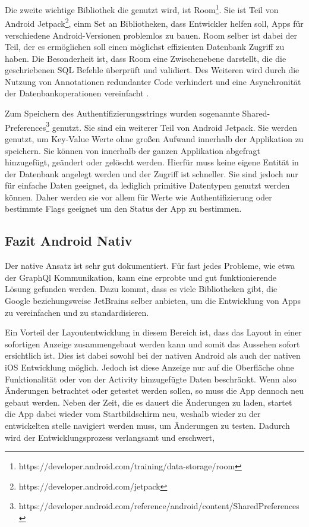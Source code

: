 Die zweite wichtige Bibliothek die genutzt wird, ist Room\footnote{https://developer.android.com/training/data-storage/room}. Sie ist Teil von Android Jetpack\footnote{https://developer.android.com/jetpack}, einm Set an Bibliotheken, dass Entwickler helfen soll, Apps für verschiedene Android-Versionen problemlos zu bauen. Room selber ist dabei der Teil, der es ermöglichen soll einen möglichst effizienten Datenbank Zugriff zu haben.
Die Besonderheit ist, dass Room eine Zwischenebene darstellt, die die geschriebenen SQL Befehle überprüft und validiert. Des Weiteren wird durch die Nutzung von Annotationen redundanter Code verhindert und eine Asynchronität der Datenbankoperationen vereinfacht \cite{Room_docs}.

Zum Speichern des Authentifizierungsstrings wurden sogenannte Shared-Preferences\footnote{https://developer.android.com/reference/android/content/SharedPreferences} genutzt. Sie sind ein weiterer Teil von Android Jetpack. Sie werden genutzt, um Key-Value Werte ohne großen Aufwand innerhalb der Applikation zu speichern. Sie können von innerhalb der ganzen Applikation abgefragt hinzugefügt, geändert oder gelöscht werden. Hierfür muss keine eigene Entität in der Datenbank angelegt werden und der Zugriff ist schneller. Sie sind jedoch nur für einfache Daten geeignet, da lediglich primitive Datentypen genutzt werden können. Daher werden sie vor allem für Werte wie Authentifizierung oder bestimmte Flags geeignet um den Status der App zu bestimmen.


\subsection{Fazit Android Nativ}
Der native Ansatz ist sehr gut dokumentiert. Für fast jedes Probleme, wie etwa der GraphQl Kommunikation, kann eine erprobte und gut funktionierende Lösung gefunden werden. Dazu kommt, dass es viele Bibliotheken gibt, die Google beziehungsweise JetBrains selber anbieten, um die Entwicklung von Apps zu vereinfachen und zu standardisieren.

Ein Vorteil der Layoutentwicklung in diesem Bereich ist, dass das Layout in einer sofortigen Anzeige zusammengebaut werden kann und somit das Aussehen sofort ersichtlich ist. Dies ist dabei sowohl bei der nativen Android als auch der nativen iOS Entwicklung möglich. Jedoch ist diese Anzeige nur auf die Oberfläche ohne Funktionalität oder von der Activity hinzugefügte Daten beschränkt. Wenn also Änderungen betrachtet oder getestet werden sollen, so muss die App dennoch neu gebaut werden. Neben der Zeit, die es dauert die Änderungen zu laden, startet die App dabei wieder vom Startbildschirm neu, weshalb wieder zu der entwickelten stelle navigiert werden muss, um Änderungen zu testen. Dadurch wird der Entwicklungsprozess verlangsamt und erschwert,
